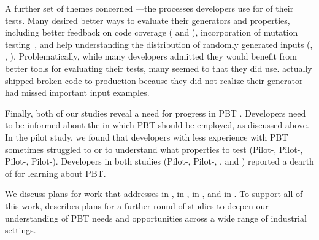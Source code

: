 A further set of themes concerned
---the processes developers use
for  of their tests. Many
desired
better ways to evaluate their generators and properties, including
better feedback on code coverage ( and ),
incorporation of mutation
testing~\cite{papadakis_mutation_2018}, and help understanding the
distribution of randomly generated
inputs (, , ). Problematically,
while many developers admitted they would benefit from better tools for
evaluating their tests, many seemed to
 that they did use.  actually shipped broken code to production because
they did not realize their generator had missed important input
examples.

Finally, both of our studies reveal a need for progress
in PBT
. Developers need to be informed about the  in which PBT should be employed, as discussed above.
In the pilot study, we found that developers with less experience with PBT
sometimes struggled to  or to understand what properties to test (Pilot-,
Pilot-,
Pilot-, Pilot-). Developers in both studies
(Pilot-, Pilot-, , and
) reported a dearth of  for
learning about PBT.

We discuss plans for work that addresses  in ,  in
,
   in , and  in .  To support all of this work,
 describes plans for a further round of
studies to deepen our understanding of PBT needs and opportunities
across a wide range of industrial settings.


